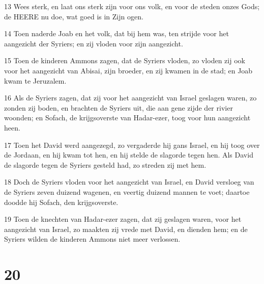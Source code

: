 \par 13 Wees sterk, en laat ons sterk zijn voor ons volk, en voor de steden onzes Gods; de HEERE nu doe, wat goed is in Zijn ogen.
\par 14 Toen naderde Joab en het volk, dat bij hem was, ten strijde voor het aangezicht der Syriers; en zij vloden voor zijn aangezicht.
\par 15 Toen de kinderen Ammons zagen, dat de Syriers vloden, zo vloden zij ook voor het aangezicht van Abisai, zijn broeder, en zij kwamen in de stad; en Joab kwam te Jeruzalem.
\par 16 Als de Syriers zagen, dat zij voor het aangezicht van Israel geslagen waren, zo zonden zij boden, en brachten de Syriers uit, die aan gene zijde der rivier woonden; en Sofach, de krijgsoverste van Hadar-ezer, toog voor hun aangezicht heen.
\par 17 Toen het David werd aangezegd, zo vergaderde hij gans Israel, en hij toog over de Jordaan, en hij kwam tot hen, en hij stelde de slagorde tegen hen. Als David de slagorde tegen de Syriers gesteld had, zo streden zij met hem.
\par 18 Doch de Syriers vloden voor het aangezicht van Israel, en David versloeg van de Syriers zeven duizend wagenen, en veertig duizend mannen te voet; daartoe doodde hij Sofach, den krijgsoverste.
\par 19 Toen de knechten van Hadar-ezer zagen, dat zij geslagen waren, voor het aangezicht van Israel, zo maakten zij vrede met David, en dienden hem; en de Syriers wilden de kinderen Ammons niet meer verlossen.

\chapter{20}


